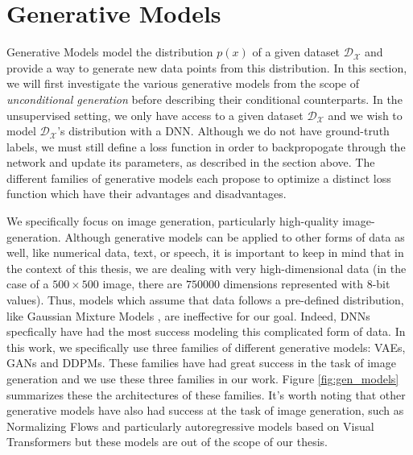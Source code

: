 





\section{Generative Models}

Generative Models model the distribution $p(x)$ of a given dataset $\mathcal{D}_{\mathcal{X}}$ and provide a 
way to generate new data points from this distribution. In this section, we will first investigate 
the various generative models from the scope of \emph{unconditional generation} before describing their 
conditional counterparts. In the unsupervised setting, we only have access to a 
given  dataset $\mathcal{D}_{\mathcal{X}}$ and we wish to model $\mathcal{D}_{\mathcal{X}}$'s distribution with a 
\ac{DNN}. Although we do not have ground-truth labels, we must still define a loss function in order to 
backpropogate through the network and update its parameters, as described in the section above. The 
different families of generative models each propose to optimize a distinct loss function which 
have their advantages and disadvantages. 

We specifically focus on image generation, particularly high-quality
image-generation. Although generative models can be applied to other forms of data as well, like 
numerical data, text, or speech, it is important to keep in mind that in the context of this thesis, 
we are dealing with very high-dimensional data (in the case 
of a $500\times500$ image, there are $750000$ dimensions represented with 8-bit values). Thus, models which assume 
that data follows a pre-defined distribution, like Gaussian Mixture Models 
\citep{em_algoo}, are 
ineffective for our goal. Indeed, \ac{DNN}s specfically have had the most success modeling 
this complicated form of data. In this work, we specifically use three families of different generative models:
\ac{VAE}s, \ac{GAN}s and \ac{DDPM}s. These families have had great success in the task of 
image generation and we use these three families in our work. Figure \ref{fig:gen_models}
summarizes these the architectures of these families. It's worth noting that other generative models have also had 
success at the task of image generation, such as Normalizing Flows \citep{rezende2015variational, dinh2014nice}
 and particularly autoregressive models based on Visual Transformers \citep{esser2021taming, ramesh2021zero, ding2021cogview, gafni2022make, yu2022scaling}
but these models are out of the scope of our thesis. 


